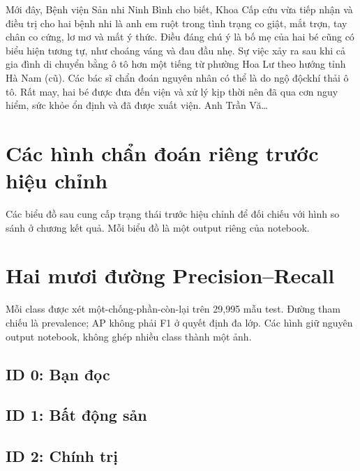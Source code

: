 Mới đây, Bệnh viện Sản nhi Ninh Bình cho biết, Khoa Cấp cứu vừa tiếp nhận và điều trị cho hai bệnh nhi là anh em ruột trong tình trạng co giật, mắt trợn, tay chân co cứng, lơ mơ và mất ý thức. Điều đáng chú ý là bố mẹ của hai bé cũng có biểu hiện tương tự, như choáng váng và đau đầu nhẹ. Sự việc xảy ra sau khi cả gia đình di chuyển bằng ô tô hơn một tiếng từ phường Hoa Lư theo hướng tỉnh Hà Nam (cũ). Các bác sĩ chẩn đoán nguyên nhân có thể là do ngộ độckhí thải ô tô. Rất may, hai bé được đưa đến viện và xử lý kịp thời nên đã qua cơn nguy hiểm, sức khỏe ổn định và đã được xuất viện. Anh Trần Vă\ldots

\section{Các hình chẩn đoán riêng trước hiệu chỉnh}
Các biểu đồ sau cung cấp trạng thái trước hiệu chỉnh để đối chiếu với hình so sánh ở chương kết quả. Mỗi biểu đồ là một output riêng của notebook.
\section{Hai mươi đường Precision--Recall}
Mỗi class được xét một-chống-phần-còn-lại trên 29,995 mẫu test. Đường tham chiếu là prevalence; AP không phải F1 ở quyết định đa lớp. Các hình giữ nguyên output notebook, không ghép nhiều class thành một ảnh.
\subsection{ID 0: Bạn đọc}
\subsection{ID 1: Bất động sản}
\subsection{ID 2: Chính trị}

